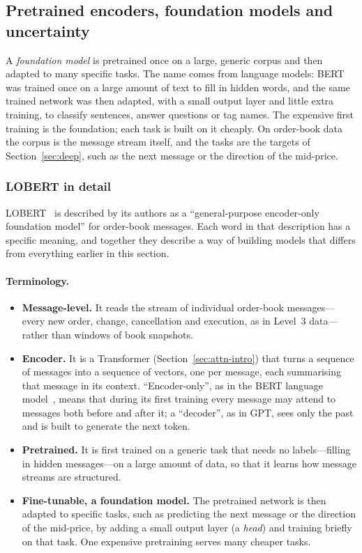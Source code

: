 \subsection{Pretrained encoders, foundation models and uncertainty}
\label{sec:foundation}

A \emph{foundation model} is pretrained once on a large, generic corpus and then adapted to many
specific tasks. The name comes from language models: BERT~\citep{devlin2019} was trained once on a large amount of
text to fill in hidden words, and the same trained network was then adapted, with a small output layer and little
extra training, to classify sentences, answer questions or tag names. The expensive first training is the
foundation; each task is built on it cheaply. On order-book data the corpus is the message stream itself, and the
tasks are the targets of Section~\ref{sec:deep}, such as the next message or the direction of the mid-price.

\subsubsection{LOBERT in detail}
\label{sec:lobert}

LOBERT~\citep{linna2025lobert} is described by its authors as a ``general-purpose encoder-only foundation model'' for
order-book messages. Each word in that description has a specific meaning, and together they describe a way of
building models that differs from everything earlier in this section.

\paragraph{Terminology.}
\begin{itemize}[leftmargin=1.5em,itemsep=2pt]
\item \textbf{Message-level.} It reads the stream of individual order-book messages---every new order, change,
  cancellation and execution, as in Level~3 data---rather than windows of book snapshots.
\item \textbf{Encoder.} It is a Transformer (Section~\ref{sec:attn-intro}) that turns a sequence of messages into a
  sequence of vectors, one per message, each summarising that message in its context. ``Encoder-only'', as in the
  BERT language model~\citep{devlin2019}, means that during its first training every message may attend to messages
  both before and after it; a ``decoder'', as in GPT, sees only the past and is built to generate the next token.
\item \textbf{Pretrained.} It is first trained on a generic task that needs no labels---filling in hidden messages---on
  a large amount of data, so that it learns how message streams are structured.
\item \textbf{Fine-tunable, a foundation model.} The pretrained network is then adapted to specific tasks, such as
  predicting the next message or the direction of the mid-price, by adding a small output layer (a \emph{head}) and
  training briefly on that task. One expensive pretraining serves many cheaper tasks.
\end{itemize}

